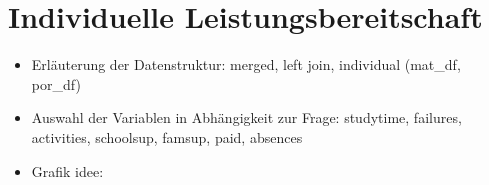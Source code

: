 \section{Individuelle Leistungsbereitschaft}

\begin{itemize}
    \item Erläuterung der Datenstruktur: merged, left join, individual (mat\_df, por\_df)
    \item Auswahl der Variablen in Abhängigkeit zur Frage:
    \subitem studytime, failures, activities, schoolsup, famsup, paid, absences
    \item Grafik idee:
\end{itemize}